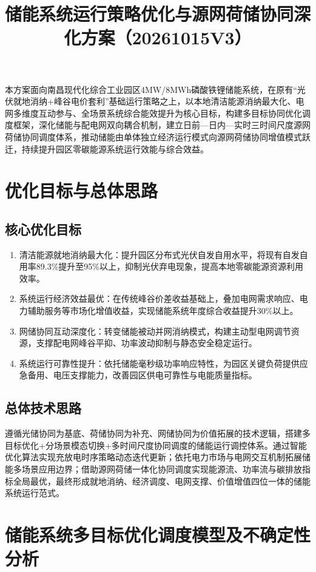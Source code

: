 \documentclass[12pt,a4paper]{article}
\title{储能系统运行策略优化与源网荷储协同深化方案（20261015V3）}
\author{}
\date{}
\begin{document}
\maketitle

本方案面向南昌现代化综合工业园区4MW/8MWh磷酸铁锂储能系统，在原有“光伏就地消纳+峰谷电价套利”基础运行策略之上，以本地清洁能源消纳最大化、电网多维度互动参与、全场景系统综合能效提升为核心目标，构建多目标协同优化调度框架，深化储能与配电网双向耦合机制，建立日前—日内—实时三时间尺度源网荷储协同调度体系，推动储能由单体独立经济运行模式向源网荷储协同增值模式跃迁，持续提升园区零碳能源系统运行效能与综合效益。

\section{优化目标与总体思路}
\subsection{核心优化目标}
\begin{enumerate}
    \item 清洁能源就地消纳最大化：提升园区分布式光伏自发自用水平，将现有自发自用率89.3\%提升至95\%以上，抑制光伏弃电现象，提高本地零碳能源资源利用效率。
    \item 系统运行经济效益最优：在传统峰谷价差收益基础上，叠加电网需求响应、电力辅助服务等市场化增值收益，实现储能系统年度综合收益提升30\%以上。
    \item 网储协同互动深度化：转变储能被动并网消纳模式，构建主动型电网调节资源，支撑配电网峰谷平抑、功率波动抑制与静态安全稳定运行。
    \item 系统运行可靠性提升：依托储能毫秒级功率响应特性，为园区关键负荷提供应急备用、电压支撑能力，改善园区供电可靠性与电能质量指标。
\end{enumerate}

\subsection{总体技术思路}
遵循光储协同为基底、荷储协同为补充、网储协同为价值拓展的技术逻辑，搭建多目标优化+分场景模态切换+多时间尺度协同调度的储能运行调控体系。通过智能优化算法实现充放电时序策略动态迭代更新；依托电力市场与电网交互机制拓展储能多场景应用边界；借助源网荷储一体化协同调度实现能源流、功率流与碳排放指标全局最优，最终形成就地消纳、经济调度、电网支撑、价值增值四位一体的储能系统运行范式。

\section{储能系统多目标优化调度模型及不确定性分析}
\end{document}
